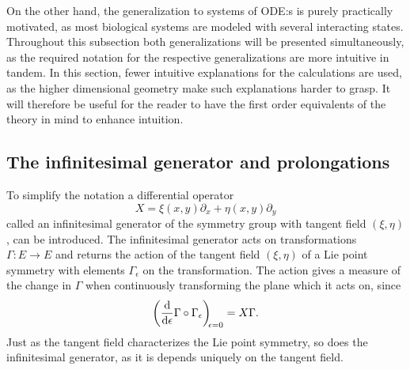 On the other hand, the generalization to systems of ODE:s is purely practically motivated, as most biological systems are modeled with several interacting states.
Throughout this subsection both generalizations will be presented simultaneously, as the required notation for the respective generalizations are more intuitive in tandem.
In this section, fewer intuitive explanations for the calculations are used, as the higher dimensional geometry make such explanations harder to grasp.
It will therefore be useful for the reader to have the first order equivalents of the theory in mind to enhance intuition.

\subsection{The infinitesimal generator and prolongations}

To simplify the notation a differential operator
\begin{equation*}
  X = \xi(x,y) \partial_x + \eta(x,y) \partial_y
\end{equation*}
called an infinitesimal generator of the symmetry group with tangent field \(\left(\xi, \eta\right)\), can be introduced.
The infinitesimal generator acts on transformations \(\Gamma: E \to E\) and returns the action of the tangent field \(\left(\xi, \eta\right)\) of a Lie point symmetry with elements \(\Gamma_\epsilon\) on the transformation.
The action gives a measure of the change in \(\Gamma\) when continuously transforming the plane which it acts on, since
\begin{equation*}
  \diff*{\Gamma \circ \Gamma_\epsilon}{\epsilon}[\epsilon = 0] = X \Gamma.
\end{equation*}
Just as the tangent field characterizes the Lie point symmetry, so does the infinitesimal generator, as it is depends uniquely on the tangent field. %

